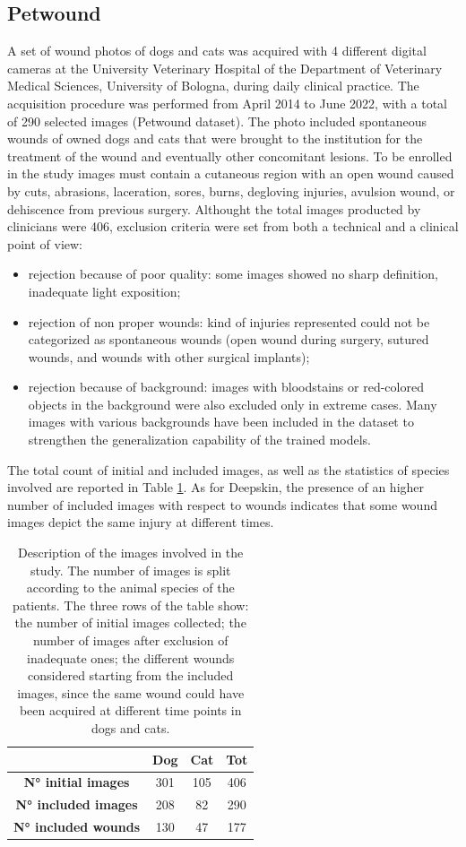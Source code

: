 \documentclass[../main.tex]{subfiles}
\begin{document}
\subsection{Petwound}
A set of wound photos of dogs and cats was acquired with 4 different digital cameras at the University Veterinary Hospital of the Department of Veterinary Medical Sciences, University of Bologna, during daily clinical practice.
The acquisition procedure was performed from April 2014 to June 2022, with a total of 290 selected images (Petwound dataset). 
The photo included spontaneous wounds of owned dogs and cats that were brought to the institution for the treatment of the wound and eventually other concomitant lesions.
To be enrolled in the study images must contain a cutaneous region with an open wound caused by cuts, abrasions, laceration, sores, burns, degloving injuries, avulsion wound, or dehiscence from previous surgery.
Althought the total images producted by clinicians were 406, exclusion criteria were set from both a technical and a clinical point of view:
\begin{itemize}
    \item rejection because of poor quality: some images showed no sharp definition, inadequate light exposition;
    \item rejection of non proper wounds: kind of injuries represented could not be categorized as spontaneous wounds (open wound during surgery, sutured wounds, and wounds with other surgical implants); 
    \item rejection because of background: images with bloodstains or red-colored objects in the background were also excluded only in extreme cases. 
    Many images with various backgrounds have been included in the dataset to strengthen the generalization capability of the trained models.
\end{itemize} 
The total count of initial and included images, as well as the statistics of species involved are reported in Table \ref{tab:PetWound}. 
As for Deepskin, the presence of an higher number of included images with respect to wounds indicates that some wound images depict the same injury at different times.
\begin{table}[!ht]
    \centering
    \begin{tabular}{c|c|c|c|}

        \textbf{} & \textbf{Dog} & \textbf{Cat} & \textbf{Tot } \\ \hline
        \textbf{N° initial images} & 301 & 105 & 406  \\ 
        \textbf{N° included images} & 208 & 82 & 290  \\ 
        \textbf{N° included wounds} & 130 & 47 & 177  \\ \hline
    \end{tabular}
    \caption{Description of the images involved in the study. The number of images is split according to the animal species of the patients. The three rows of the table show: the number of initial images collected; the number of images after exclusion of inadequate ones; the different wounds considered starting from the included images, since the same wound could have been acquired at different time points in dogs and cats.}
    \label{tab:PetWound}
\end{table}
\end{document}
